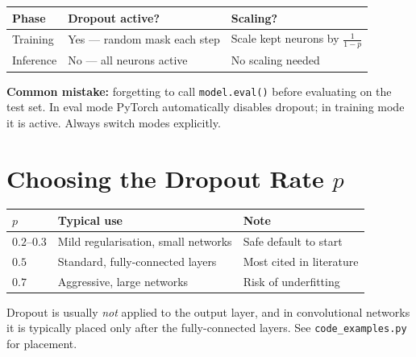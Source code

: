 \documentclass[12pt, a4paper]{article}
\theoremstyle{definition}
\begin{document}
\begin{center}
\renewcommand{\arraystretch}{1.3}
\begin{tabular}{lll}
\toprule
Phase & Dropout active? & Scaling? \\
\midrule
Training   & Yes — random mask each step & Scale kept neurons by $\frac{1}{1-p}$ \\
Inference  & No — all neurons active      & No scaling needed \\
\bottomrule
\end{tabular}
\end{center}

\begin{warnbox}
\textbf{Common mistake:} forgetting to call \texttt{model.eval()} before
evaluating on the test set.  In eval mode PyTorch automatically disables
dropout; in training mode it is active.  Always switch modes explicitly.
\end{warnbox}

\section{Choosing the Dropout Rate $p$}

\begin{center}
\renewcommand{\arraystretch}{1.3}
\begin{tabular}{lll}
\toprule
$p$ & Typical use & Note \\
\midrule
$0.2$--$0.3$ & Mild regularisation, small networks & Safe default to start \\
$0.5$        & Standard, fully-connected layers    & Most cited in literature \\
$0.7$        & Aggressive, large networks          & Risk of underfitting \\
\bottomrule
\end{tabular}
\end{center}

\begin{notebox}
Dropout is usually \emph{not} applied to the output layer, and in
convolutional networks it is typically placed only after the
fully-connected layers.  See \texttt{code\_examples.py} for placement.
\end{notebox}
\end{document}
